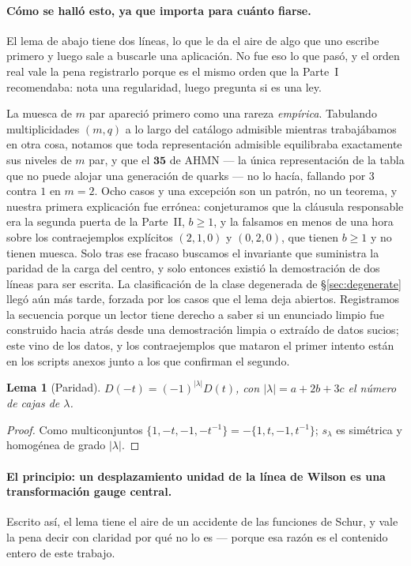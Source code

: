 \documentclass[11pt,a4paper]{article}
\newtheorem{lema}{Lema}
\newcommand{\lam}{|\lambda|}
\begin{document}
\paragraph{Cómo se halló esto, ya que importa para cuánto fiarse.} El lema de abajo tiene dos
líneas, lo que le da el aire de algo que uno escribe primero y luego sale a buscarle una
aplicación. No fue eso lo que pasó, y el orden real vale la pena registrarlo porque es el
mismo orden que la Parte~I recomendaba: nota una regularidad, luego pregunta si es una ley.

La muesca de $m$ par apareció primero como una rareza \emph{empírica}. Tabulando
multiplicidades $(m,q)$ a lo largo del catálogo admisible mientras trabajábamos en otra cosa,
notamos que toda representación admisible equilibraba exactamente sus niveles de $m$ par, y
que el $\mathbf{35}$ de AHMN --- la única representación de la tabla que no puede alojar una
generación de quarks --- no lo hacía, fallando por $3$ contra $1$ en $m=2$. Ocho casos y una
excepción son un patrón, no un teorema, y nuestra primera explicación fue errónea:
conjeturamos que la cláusula responsable era la segunda puerta de la Parte~II, $b\ge1$, y la
falsamos en menos de una hora sobre los contraejemplos explícitos $(2,1,0)$ y $(0,2,0)$, que
tienen $b\ge1$ y no tienen muesca. Solo tras ese fracaso buscamos el invariante que
suministra la paridad de la carga del centro, y solo entonces existió la demostración de dos
líneas para ser escrita. La clasificación de la clase degenerada de \S\ref{sec:degenerate}
llegó aún más tarde, forzada por los casos que el lema deja abiertos. Registramos la
secuencia porque un lector tiene derecho a saber si un enunciado limpio fue construido hacia
atrás desde una demostración limpia o extraído de datos sucios; este vino de los datos, y los
contraejemplos que mataron el primer intento están en los scripts anexos junto a los que
confirman el segundo.

\begin{lema}[Paridad]\label{lem:parity}
$D(-t)=(-1)^{\lam}D(t)$, con $\lam=a+2b+3c$ el número de cajas de $\lambda$.
\end{lema}
\begin{proof}
Como multiconjuntos $\{1,-t,-1,-t^{-1}\}=-\{1,t,-1,t^{-1}\}$; $s_\lambda$ es simétrica y
homogénea de grado $\lam$.
\end{proof}

\paragraph{El principio: un desplazamiento unidad de la línea de Wilson es una transformación
gauge central.} Escrito así, el lema tiene el aire de un accidente de las funciones de Schur,
y vale la pena decir con claridad por qué no lo es --- porque esa razón es el contenido entero
de este trabajo.
\end{document}
